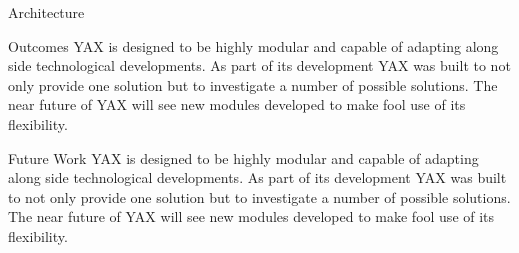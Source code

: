 \documentclass[final,t]{beamer}
\begin{document}
\begin{frame}{}
\begin{columns}[t]
\begin{column}{.3\linewidth}
\begin{block}{Architecture}
        \end{block}
        \begin{block}{Outcomes}
            YAX is designed to be highly modular and capable of adapting along side technological developments. As part of its development
            YAX was built to not only provide one solution but to investigate a number of possible solutions. The near future of YAX will
            see new modules developed to make fool use of its flexibility.

        \end{block}
        \begin{block}{Future Work}
            YAX is designed to be highly modular and capable of adapting along side technological developments. As part of its development
            YAX was built to not only provide one solution but to investigate a number of possible solutions. The near future of YAX will
            see new modules developed to make fool use of its flexibility.

        \end{block}





    \end{column}
  \end{columns}

\end{frame}
\end{document}
